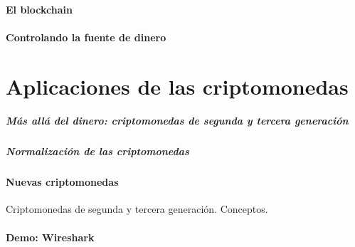 \documentclass[10pt, a4paper]{article}
\newcommand\dout{\bgroup \markoverwith{\rule[0.2ex]{0.1pt}{0.4pt}\rule[0.8ex]{0.1pt}{0.4pt}}\ULon}
\def\dout{\bgroup
 \markoverwith{\lower-0.35ex\hbox
 {\kern-.03em\vbox{\hrule width.2em\kern0.45ex\hrule}\kern-.03em}}%
 \ULon}
\theoremstyle{theorem-style}
\theoremstyle{theorem-style}
\theoremstyle{definition-style}
\theoremstyle{remark-style}
\theoremstyle{example-style}
\theoremstyle{definition-style}
\theoremstyle{remark-style}
\begin{document}
\subsection{El blockchain}\label{el-blockchain}

\subsection{Controlando la fuente de
dinero}\label{controlando-la-fuente-de-dinero}

\part{Aplicaciones de las
criptomonedas}\label{aplicaciones-de-las-criptomonedas}

\subsubsection{Más allá del dinero: criptomonedas de segunda y tercera
generación}\label{muxe1s-alluxe1-del-dinero-criptomonedas-de-segunda-y-tercera-generaciuxf3n}

\subsubsection{Normalización de las
criptomonedas}\label{normalizaciuxf3n-de-las-criptomonedas}

\subsection{Nuevas criptomonedas}\label{nuevas-criptomonedas}

Criptomonedas de segunda y tercera generación. Conceptos.

\subsection{Demo: Wireshark}\label{demo-wireshark}

\dout{D}
\end{document}
